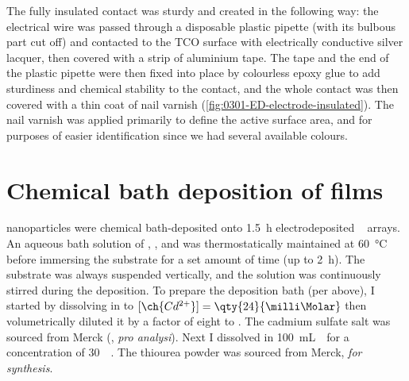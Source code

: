 \documentclass[draft,webedition,openright,titles,swedish,english]{LuaUUThesis}\usepackage[]{graphicx}\usepackage[]{xcolor}
\begin{document}
The fully insulated contact was sturdy and created in the following way:
the electrical wire was passed through
a disposable plastic pipette (with its bulbous part cut off) and contacted to
the \gls{TCO} surface with electrically conductive silver lacquer,
then covered with a strip of aluminium tape.
The tape and the end of the plastic pipette were then fixed into place by
colourless epoxy glue to add sturdiness and chemical stability to the contact,
and the whole contact was then covered with a thin coat of nail varnish (\cref{fig:0301-ED-electrode-insulated}).
The nail varnish was applied primarily to define the active surface area, and
for purposes of easier identification since we had several
available colours.





\section[Chemical bath deposition of CdS films]{\texorpdfstring{Chemical bath deposition of  films}{Chemical bath deposition of CdS films}}
\label{synthesis:chemical-bath-deposition}

 nanoparticles were chemical bath-deposited onto
\qty{1.5}{\hour} electrodeposited \zincox\  arrays.
An aqueous bath solution of ,
, and
 was
thermostatically maintained at \qty{60}{\celsius} before immersing the
substrate for a set amount of time (up to \qty{2}{\hour}).
The substrate was always suspended vertically, and the solution was continuously
stirred during the deposition.
To prepare the deposition bath (per above), I started by dissolving
 in 
to $[\ch{Cd^{2+}}]=\qty{24}{\milli\Molar}$
then volumetrically diluted it by a factor of eight to
.
The cadmium sulfate salt was sourced from Merck (, \emph{pro analysi}).
Next I dissolved  in \qty{100}{\milli\L}~\water\
for a concentration of \qty{30}{\milli\Molar}.
The thiourea powder was sourced from Merck, \emph{for synthesis}.
\end{document}
